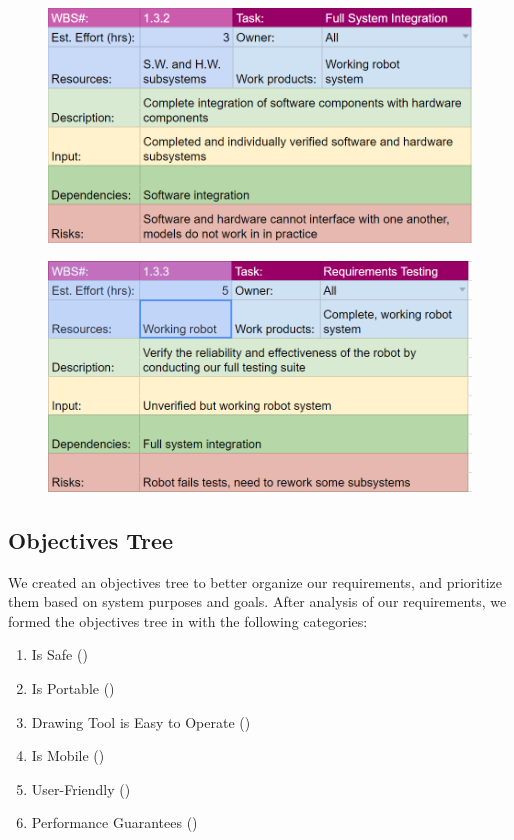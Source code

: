 \begin{figure}[h!]
\centering
\includegraphics[width=0.98\columnwidth]{wbs_schedule/wbs_dict_int2.PNG}
\label{fig:int1}
\end{figure}
\begin{figure}[h!]
\centering
\includegraphics[width=0.98\columnwidth]{wbs_schedule/wbs_dict_int3.PNG}
\label{fig:int1}
\end{figure}

\clearpage

\subsection{Objectives Tree}
\label{sec:objectives_tree}
We created an objectives tree to better organize our requirements, and prioritize them based on system purposes and goals. After analysis of our requirements, we
formed the objectives tree in  with the following categories:

\begin{enumerate}
\item Is Safe ()
\item Is Portable ()
\item Drawing Tool is Easy to Operate ()
\item Is Mobile ()
\item User-Friendly ()
\item Performance Guarantees ()
\end{enumerate}

